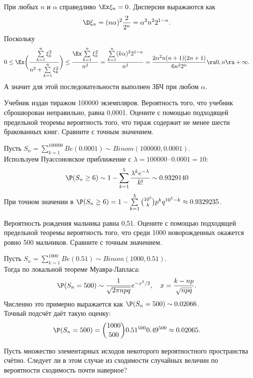 \begin{solution}
    При любых $n$ и $\alpha$ справедливо $\Ex \xi_n = 0$.
    Дисперсии выражаются как
    \[
        \D \xi_n = (n\alpha)^2 \dfrac{2}{2^n} = \alpha^2 n^{2}2^{1 - n}.
    \]
    Поскольку
    \[
        0 \leq \Ex \biggr(\dfrac{\sum\limits_{k = 1}^n \xi_k^2}{n^2 + \sum\limits_{k = 1}^n \xi_k^2}\biggr) \leq \dfrac{\Ex\sum\limits_{k = 1}^n \xi_k^2}{n^2} = \dfrac{\sum\limits_{k = 1}^n (k\alpha)^2 2^{1 - n}}{n^2} = \dfrac{2\alpha^2 n(n + 1)(2n + 1)}{6n^2 2^{n}} \ra 0, n \ra +\infty.
    \]
    А значит для этой последовательности выполнен ЗБЧ при любом $\alpha$.
\end{solution}
\begin{problem}
    Учебник издан тиражом 100000 экземпляров.
    Вероятность того, что учебник сброшюрован неправильно, равна 0,0001.
    Оцените с помощью подходящей предельной теоремы вероятность того, что тираж содержит не менее шести бракованных книг.
    Сравните с точным значением.
\end{problem}
\begin{solution}
    Пусть $S_n = \sum\limits_{k = 1}^{100000} Be(0.0001) \sim Binom(100000, 0.0001)$. \\
    Используем Пуассоновское приближение с $\lambda = 100000 \cdot 0.0001 = 10$:
    \[
        \P(S_n \geq 6) \sim 1 - \sum\limits_{k = 1}^{5}\dfrac{\lambda^k e^{-\lambda}}{k!} \sim 0.9329140
    \]
    При точном значении в $\P(S_n \geq 6) = 1 - \sum\limits_{k = 1}^{5}\binom{10^5}{k}p^{k}q^{10^5-k} \approx 0.9329235$.
\end{solution}
\begin{problem}
    Вероятность рождения мальчика равна 0,51.
    Оцените с помощью подходящей предельной теоремы вероятность того, что среди 1000 новорожденных окажется ровно 500 мальчиков.
    Сравните с точным значением.
\end{problem}
\begin{solution}
    Пусть $S_n = \sum\limits_{k = 1}^{1000} Be(0.51) \sim Binom(1000, 0.51)$. \\
    Тогда по локальной теореме Муавра-Лапласа:
    \[
        \P(S_n = 500) \sim \dfrac{1}{\sqrt{2\pi n p q}}e^{-x^2/2}, \quad x = \dfrac{k - np}{\sqrt{npq}}.
    \]
    Численно это примерно выражается как $\P(S_n = 500) \sim 0.02066$. \\
    Точный подсчёт даёт такую оценку:
    \[
        \P(S_n = 500) = \binom{1000}{500} 0.51^{500}0.49^{500} \approx 0.02065.
    \]
\end{solution}
\begin{problem}
    Пусть множество элементарных исходов некоторого вероятностного пространства счётно.
    Следует ли в этом случае из сходимости случайных величин по вероятности сходимость почти наверное?
\end{problem}
